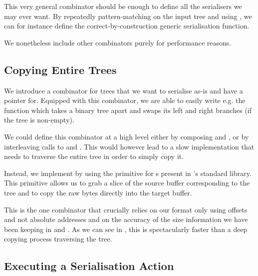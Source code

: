This very general combinator should be enough to define all the
serialisers we may ever want.
%
By repeatedly pattern-matching on the input tree and using \IdrisFunction{(\#)},
we can for instance define the correct-by-construction generic serialisation function.


We nonetheless include other combinators purely for performance reasons.

\subsection{Copying Entire Trees}

We introduce a  combinator for trees that we want to
serialise as-is and have a pointer for.
%
Equipped with this combinator, we are able to easily write e.g.
the  function which takes a binary tree apart
and swaps its left and right branches (if the tree is non-empty).


We could define this  combinator at a high level
either by composing
 and ,
or by interleaving calls to  and \IdrisFunction{(\#)}.
%
This would however lead to a slow implementation that needs to
traverse the entire tree in order to simply copy it.

Instead, we implement  by using the
 primitive for s
present in \idris{}'s standard library.
%
This primitive allows us to grab a slice of the source buffer
corresponding to the tree
and to copy the raw bytes directly into the target buffer.


This is the one combinator that crucially relies
on our format only using offsets and not absolute addresses
and on the accuracy of the size information we have been keeping
in  and .
%
As we can see in , this is spectacularly faster than
a deep copying process traversing the tree.

\subsection{Executing a Serialisation Action}

